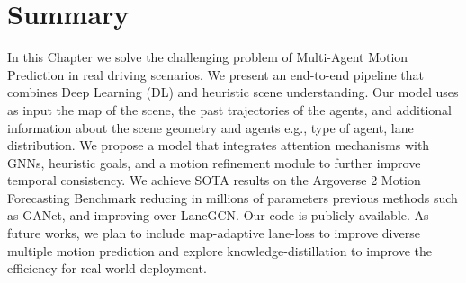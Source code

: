 \begin{figure}[h]
	\label{fig:chapter_7/argoverse_2_qualitative_results}
\end{figure}

\section{Summary}
\label{sec:7_summary}

In this Chapter we solve the challenging problem of Multi-Agent Motion Prediction in real driving scenarios. We present an end-to-end pipeline that combines Deep Learning (DL) and heuristic scene understanding. Our model uses as input the map of the scene, the past trajectories of the agents, and additional information about the scene geometry and agents e.g., type of agent, lane distribution. We propose a model that integrates attention mechanisms with GNNs, heuristic goals, and a motion refinement module to further improve temporal consistency. We achieve SOTA results on the Argoverse 2 Motion Forecasting Benchmark reducing in millions of parameters previous methods such as GANet, and improving over LaneGCN. Our code is publicly available. As future works, we plan to include map-adaptive lane-loss to improve diverse multiple motion prediction and explore knowledge-distillation to improve the efficiency for real-world deployment.